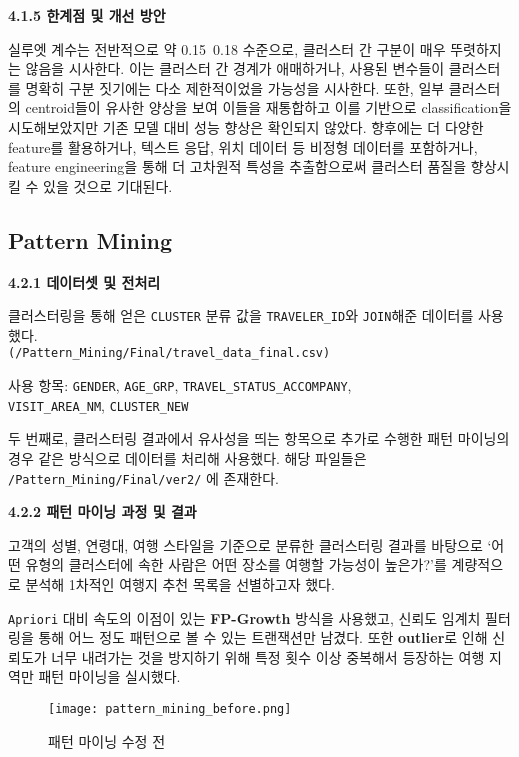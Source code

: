 \documentclass[sigconf]{acmart}
\begin{document}
\begin{CJK}{UTF8}{mj}
\noindent\textbf{4.1.5 한계점 및 개선 방안}\par
실루엣 계수는 전반적으로 약 0.15~0.18 수준으로, 클러스터 간 구분이 매우 뚜렷하지는 않음을 시사한다. 이는 클러스터 간 경계가 애매하거나, 사용된 변수들이 클러스터를 명확히 구분 짓기에는 다소 제한적이었을 가능성을 시사한다. 
또한, 일부 클러스터의 centroid들이 유사한 양상을 보여 이들을 재통합하고 이를 기반으로 classification을 시도해보았지만 기존 모델 대비 성능 향상은 확인되지 않았다.
향후에는 더 다양한 feature를 활용하거나, 텍스트 응답, 위치 데이터 등 비정형 데이터를 포함하거나, feature engineering을 통해 더 고차원적 특성을 추출함으로써 클러스터 품질을 향상시킬 수 있을 것으로 기대된다.



\subsection{Pattern Mining}

\noindent\textbf{4.2.1 데이터셋 및 전처리}\par

클러스터링을 통해 얻은 \texttt{CLUSTER} 분류 값을 \texttt{TRAVELER\_ID}와 \texttt{JOIN}해준 데이터를 사용했다. \\\texttt{(/Pattern\_Mining/Final/travel\_data\_final.csv)}

사용 항목: \texttt{GENDER}, \texttt{AGE\_GRP}, \texttt{TRAVEL\_STATUS\_ACCOMPANY},\\\texttt{VISIT\_AREA\_NM}, \texttt{CLUSTER\_NEW}

두 번째로, 클러스터링 결과에서 유사성을 띄는 항목으로 추가로 수행한 패턴 마이닝의 경우 같은 방식으로 데이터를 처리해 사용했다. 해당 파일들은 \texttt{/Pattern\_Mining/Final/ver2/} 에 존재한다.

\vspace{0.5em}
\noindent\textbf{4.2.2 패턴 마이닝 과정 및 결과}\par

고객의 성별, 연령대, 여행 스타일을 기준으로 분류한 클러스터링 결과를 바탕으로 ‘어떤 유형의 클러스터에 속한 사람은 어떤 장소를 여행할 가능성이 높은가?’를 계량적으로 분석해 1차적인 여행지 추천 목록을 선별하고자 했다.

\texttt{Apriori} 대비 속도의 이점이 있는 \textbf{FP-Growth} 방식을 사용했고, 신뢰도 임계치 필터링을 통해 어느 정도 패턴으로 볼 수 있는 트랜잭션만 남겼다. 또한 \textbf{outlier}로 인해 신뢰도가 너무 내려가는 것을 방지하기 위해 특정 횟수 이상 중복해서 등장하는 여행 지역만 패턴 마이닝을 실시했다.

\begin{figure}[H]
  \centering
  \texttt{[image: pattern\_mining\_before.png]}
  \caption{패턴 마이닝 수정 전}
  \label{fig:pattern_mining_before}
\end{figure}


\end{CJK}
\end{document}
